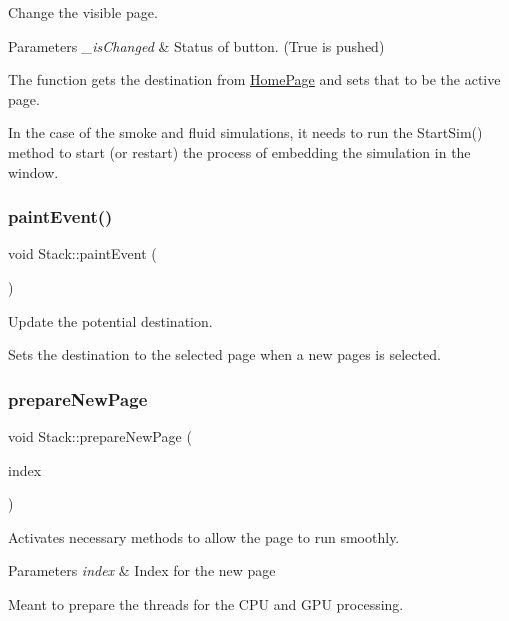 Change the visible page. 
\begin{DoxyParams}{Parameters}
{\em \+\_\+is\+Changed} & Status of button. (True is pushed)\\
\hline
\end{DoxyParams}
The function gets the destination from \mbox{\hyperlink{classHomePage}{Home\+Page}} and sets that to be the active page.

In the case of the smoke and fluid simulations, it needs to run the Start\+Sim() method to start (or restart) the process of embedding the simulation in the window. \mbox{\label{classStack_a58526db5899d5e03a6ad306a96f91d62}} 
\subsubsection{\texorpdfstring{paintEvent()}{paintEvent()}}
{\footnotesize\ttfamily void Stack\+::paint\+Event (\begin{DoxyParamCaption}\item[{Q\+Paint\+Event $\ast$}]{ }\end{DoxyParamCaption})\hspace{0.3cm}{\ttfamily [protected]}}

Update the potential destination.

Sets the destination to the selected page when a new pages is selected. \mbox{\label{classStack_a836814b5492af3a0a4cc613d11b56397}} 
\subsubsection{\texorpdfstring{prepareNewPage}{prepareNewPage}}
{\footnotesize\ttfamily void Stack\+::prepare\+New\+Page (\begin{DoxyParamCaption}\item[{int}]{index }\end{DoxyParamCaption})\hspace{0.3cm}{\ttfamily [slot]}}

Activates necessary methods to allow the page to run smoothly. 
\begin{DoxyParams}{Parameters}
{\em index} & Index for the new page\\
\hline
\end{DoxyParams}
Meant to prepare the threads for the C\+PU and G\+PU processing. 

